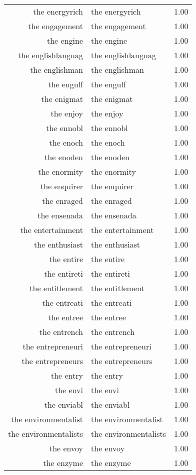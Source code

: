 \begin{table}[ht]
\begin{tabular}{rlr}
  the energyrich & the energyrich & 1.00 \\ 
  the engagement & the engagement & 1.00 \\ 
  the engine & the engine & 1.00 \\ 
  the englishlanguag & the englishlanguag & 1.00 \\ 
  the englishman & the englishman & 1.00 \\ 
  the engulf & the engulf & 1.00 \\ 
  the enigmat & the enigmat & 1.00 \\ 
  the enjoy & the enjoy & 1.00 \\ 
  the ennobl & the ennobl & 1.00 \\ 
  the enoch & the enoch & 1.00 \\ 
  the enoden & the enoden & 1.00 \\ 
  the enormity & the enormity & 1.00 \\ 
  the enquirer & the enquirer & 1.00 \\ 
  the enraged & the enraged & 1.00 \\ 
  the ensenada & the ensenada & 1.00 \\ 
  the entertainment & the entertainment & 1.00 \\ 
  the enthusiast & the enthusiast & 1.00 \\ 
  the entire & the entire & 1.00 \\ 
  the entireti & the entireti & 1.00 \\ 
  the entitlement & the entitlement & 1.00 \\ 
  the entreati & the entreati & 1.00 \\ 
  the entree & the entree & 1.00 \\ 
  the entrench & the entrench & 1.00 \\ 
  the entrepreneuri & the entrepreneuri & 1.00 \\ 
  the entrepreneurs & the entrepreneurs & 1.00 \\ 
  the entry & the entry & 1.00 \\ 
  the envi & the envi & 1.00 \\ 
  the enviabl & the enviabl & 1.00 \\ 
  the environmentalist & the environmentalist & 1.00 \\ 
  the environmentalists & the environmentalists & 1.00 \\ 
  the envoy & the envoy & 1.00 \\ 
  the enzyme & the enzyme & 1.00 \\ 

\end{tabular}
\end{table}
